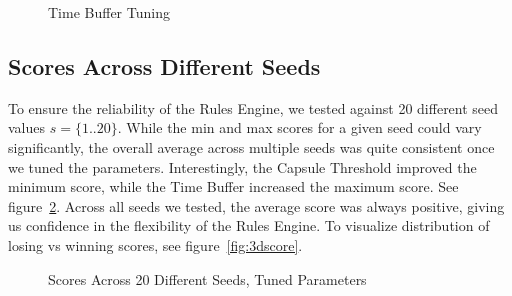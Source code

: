 \documentclass[11pt, oneside]{article}   	%
\begin{document}
\begin{figure}[h!]
  \centering
  \caption{Time Buffer Tuning}
  \label{fig:buffer}
 \end{figure}


\subsection{Scores Across Different Seeds}

To ensure the reliability of the Rules Engine, we tested against 20 different seed values $s = \{1..20\}$. While the min and max scores for a given seed could vary significantly, the overall average across multiple seeds was quite consistent once we tuned the parameters. Interestingly, the Capsule Threshold improved the minimum score, while the Time Buffer increased the maximum score. See figure~\ref{fig:seeds}. Across all seeds we tested, the average score was always positive, giving us confidence in the flexibility of the Rules Engine. To visualize distribution of losing vs winning scores, see figure~\ref{fig:3dscore}.

\begin{figure}[h!]
  \centering
  \caption{Scores Across 20 Different Seeds, Tuned Parameters}
  \label{fig:seeds}
 \end{figure}
\end{document}

